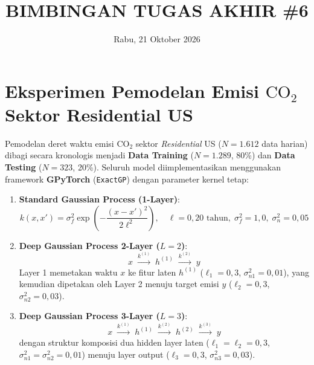 \documentclass[11pt,a4paper]{article}
\title{
    \vspace{-1.2cm}
    \textbf{\Large BIMBINGAN TUGAS AKHIR \#6} \\[0.2em]
}
\author{}
\date{Rabu, 21 Oktober 2026}
\theoremstyle{plain}
\theoremstyle{definition}
\theoremstyle{remark}
\begin{document}
\maketitle
\vspace{-0.8cm}


\section{Eksperimen Pemodelan Emisi \texorpdfstring{$\text{CO}_2$}{CO2} Sektor Residential US}
\label{sec:eksperimen_co2_us}

\noindent Pemodelan deret waktu emisi $\text{CO}_2$ sektor \textit{Residential} US ($N = 1.612$ data harian) dibagi secara kronologis menjadi \textbf{Data Training} ($N = 1.289$, 80\%) dan \textbf{Data Testing} ($N = 323$, 20\%). Seluruh model diimplementasikan menggunakan framework \textbf{GPyTorch} (\texttt{ExactGP}) dengan parameter kernel tetap:
\begin{enumerate}\setlength{\itemsep}{2pt}
    \item \textbf{Standard Gaussian Process (1-Layer)}:
    \begin{equation}
        k(x, x') = \sigma_f^2 \exp\left( -\frac{(x - x')^2}{2\ell^2} \right), \quad \ell = 0{,}20 \text{ tahun}, \; \sigma_f^2 = 1{,}0, \; \sigma_n^2 = 0{,}05
    \end{equation}
    
    \item \textbf{Deep Gaussian Process 2-Layer ($L = 2$)}:
    \begin{equation}
        x \;\xrightarrow{k^{(1)}}\; h^{(1)} \;\xrightarrow{k^{(2)}}\; y
    \end{equation}
    Layer 1 memetakan waktu $x$ ke fitur laten $h^{(1)}$ ($\ell_1 = 0{,}3$, $\sigma_{n1}^2 = 0{,}01$), yang kemudian dipetakan oleh Layer 2 menuju target emisi $y$ ($\ell_2 = 0{,}3$, $\sigma_{n2}^2 = 0{,}03$).

    \item \textbf{Deep Gaussian Process 3-Layer ($L = 3$)}:
    \begin{equation}
        x \;\xrightarrow{k^{(1)}}\; h^{(1)} \;\xrightarrow{k^{(2)}}\; h^{(2)} \;\xrightarrow{k^{(3)}}\; y
    \end{equation}
    dengan struktur komposisi dua hidden layer laten ($\ell_1 = \ell_2 = 0{,}3$, $\sigma_{n1}^2 = \sigma_{n2}^2 = 0{,}01$) menuju layer output ($\ell_3 = 0{,}3$, $\sigma_{n3}^2 = 0{,}03$).
\end{enumerate}
\end{document}

